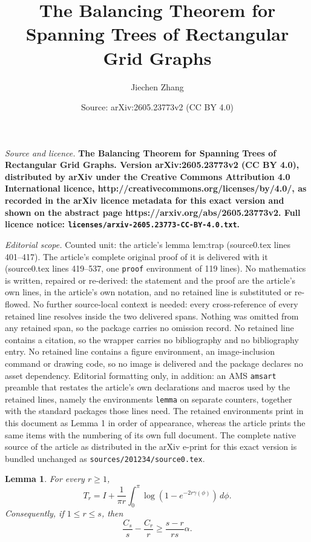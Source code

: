 \documentclass[10pt,a4paper]{amsart}
\title{\bfseries The Balancing Theorem for Spanning Trees of Rectangular Grid Graphs}
\author{Jiechen Zhang}
\date{Source: arXiv:2605.23773v2 (CC BY 4.0)}
\newtheorem{lemma}{Lemma}
\newcommand{\dd}{\,d}
\begin{document}
\maketitle

\noindent\emph{Source and licence.} \bfseries The Balancing Theorem for Spanning Trees of Rectangular Grid Graphs. Version arXiv:2605.23773v2 (CC BY 4.0), distributed by arXiv under the Creative Commons Attribution 4.0 International licence, http://creativecommons.org/licenses/by/4.0/, as recorded in the arXiv licence metadata for this exact version and shown on the abstract page https://arxiv.org/abs/2605.23773v2. Full licence notice: \texttt{licenses/arxiv-2605.23773-CC-BY-4.0.txt}.\par\smallskip

\noindent\textit{Editorial scope.} Counted unit: the article's lemma lem:trap (source0.tex lines 401--417). The article's complete original proof of it is delivered with it (source0.tex lines 419--537, one \texttt{proof} environment of 119 lines). No mathematics is written, repaired or re-derived: the statement and the proof are the article's own lines, in the article's own notation, and no retained line is substituted or re-flowed.  No further source-local context is needed: every cross-reference of every retained line resolves inside the two delivered spans.  Nothing was omitted from any retained span, so the package carries no omission record.  No retained line contains a citation, so the wrapper carries no bibliography and no bibliography entry.  No retained line contains a figure environment, an image-inclusion command or drawing code, so no image is delivered and the package declares no asset dependency.  Editorial formatting only, in addition: an AMS \texttt{amsart} preamble that restates the article's own declarations and macros used by the retained lines, namely the environments \texttt{lemma} on separate counters, together with the standard packages those lines need.  The retained environments print in this document as Lemma 1 in order of appearance, whereas the article prints the same items with the numbering of its own full document.  The complete native source of the article as distributed in the arXiv e-print for this exact version is bundled unchanged as \texttt{sources/201234/source0.tex}.
\begin{lemma}\label{lem:trap}
For every $r\ge1$,
\begin{equation}\label{eq:trap-identity}
  T_r
  =
  I+
  \frac{1}{\pi r}
  \int_0^\pi
  \log\left(1-e^{-2r\gamma(\phi)}\right)\dd\phi.
\end{equation}
Consequently, if $1\le r\le s$, then
\begin{equation}\label{eq:C-trapezoidal}
  \frac{C_s}{s}-\frac{C_r}{r}
  \ge
  \frac{s-r}{rs}\alpha.
\end{equation}
\end{lemma}
\end{document}
